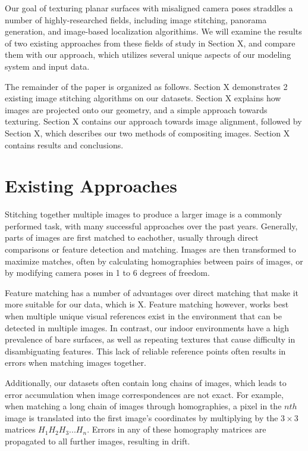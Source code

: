 \documentclass[]{spie}  %
\begin{document}
Our goal of texturing planar surfaces with misaligned camera poses
straddles a number of highly-researched fields, including image
stitching, panorama generation, and image-based localization
algorithims. We will examine the results of two existing approaches
from these fields of study in Section X, and compare them with our
approach, which utilizes several unique aspects of our modeling system
and input data.

The remainder of the paper is organized as follows. Section X
demonstrates 2 existing image stitching algorithms on our
datasets. Section X explains how images are projected onto our
geometry, and a simple approach towards texturing. Section X contains
our approach towards image alignment, followed by Section X, which
describes our two methods of compositing images. Section X contains
results and conclusions.

\section{Existing Approaches}
Stitching together multiple images to produce a larger image is a
commonly performed task, with many successful approaches over the past
years. Generally, parts of images are first matched to eachother,
usually through direct comparisons or feature detection and
matching. Images are then transformed to maximize matches, often by
calculating homographies between pairs of images, or by modifying
camera poses in 1 to 6 degrees of freedom.

Feature matching has a number of advantages over direct matching that
make it more suitable for our data, which is X. Feature matching
however, works best when multiple unique visual references exist in the
environment that can be detected in multiple images. In contrast, our
indoor environments have a high prevalence of bare surfaces, as well
as repeating textures that cause difficulty in disambiguating
features. This lack of reliable reference points often results in
errors when matching images together.

Additionally, our datasets often contain long chains of images, which
leads to error accumulation when image correspondences are not
exact. For example, when matching a long chain of images through
homographies, a pixel in the $nth$ image is translated into the first
image's coordinates by multiplying by the $3\times3$ matrices $H_1 H_2
H_3 ... H_n$. Errors in any of these homography matrices are
propagated to all further images, resulting in drift.
\end{document}
